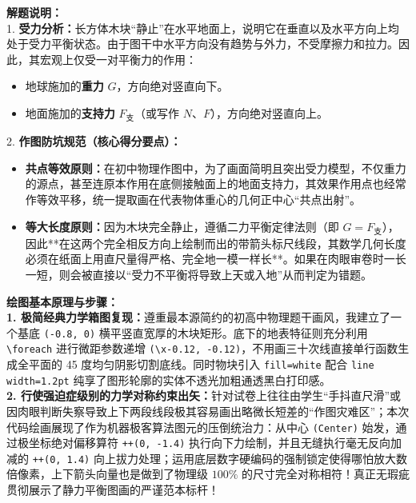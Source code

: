 \vspace{0.6cm}

{\small\color{gray}
\textbf{解题说明：}\\
1. \textbf{受力分析：}长方体木块“静止”在水平地面上，说明它在垂直以及水平方向上均处于受力平衡状态。由于图干中水平方向没有趋势与外力，不受摩擦力和拉力。因此，其宏观上仅受一对平衡力的作用：
\begin{itemize}
    \item 地球施加的\textbf{重力} $G$，方向绝对竖直向下。
    \item 地面施加的\textbf{支持力} $F_{\text{支}}$（或写作 $N$、$F$），方向绝对竖直向上。
\end{itemize}
2. \textbf{作图防坑规范（核心得分要点）：}
\begin{itemize}
    \item \textbf{共点等效原则：}在初中物理作图中，为了画面简明且突出受力模型，不仅重力的源点，甚至连原本作用在底侧接触面上的地面支持力，其效果作用点也经常作等效平移，统一提取画在代表物体重心的几何正中心“共点出射”。
    \item \textbf{等大长度原则：}因为木块完全静止，遵循二力平衡定律法则（即 $G = F_{\text{支}}$），因此**在这两个完全相反方向上绘制而出的带箭头标尺线段，其数学几何长度必须在纸面上用直尺量得严格、完全地一模一样长**。如果在肉眼审卷时一长一短，则会被直接以“受力不平衡将导致上天或入地”从而判定为错题。
\end{itemize}
}

\vspace{0.6cm}

{\small\color{blue!70!black}
\textbf{绘图基本原理与步骤：}\\
\textbf{1. 极简经典力学箱图复现：}遵重最本源简约的初高中物理题干画风，我建立了一个基底 \texttt{(-0.8, 0)} 横平竖直宽厚的木块矩形。底下的地表特征则充分利用 \texttt{\textbackslash foreach} 进行微距参数递增 \texttt{(\textbackslash x-0.12, -0.12)}，不用画三十次线直接单行函数生成全平面的 45 度均匀阴影切割底线。同时物块引入 \texttt{fill=white} 配合 \texttt{line width=1.2pt} 纯享了图形轮廓的实体不透光加粗通透黑白打印感。\\
\textbf{2. 行使强迫症级别的力学对称约束出矢：}针对试卷上往往由学生“手抖直尺滑”或因肉眼判断失察导致上下两段线段极其容易画出略微长短差的“作图灾难区”；本次代码绘画展现了作为机器极客算法图元的压倒统治力：从中心 \texttt{(Center)} 始发，通过极坐标绝对偏移算符 \texttt{++(0, -1.4)} 执行向下力绘制，并且无缝执行毫无反向加减的 \texttt{++(0, 1.4)} 向上拔力处理；运用底层数字硬编码的强制锁定使得哪怕放大数倍像素，上下箭头向量也是做到了物理级 $100\%$ 的尺寸完全对称相符！真正无瑕疵贯彻展示了静力平衡图画的严谨范本标杆！
}

